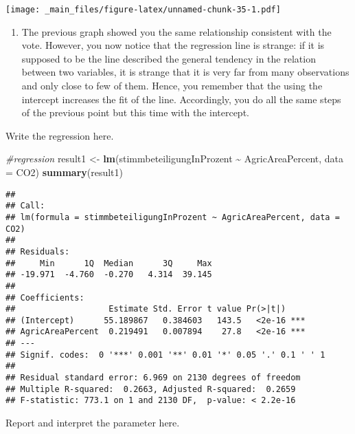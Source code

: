 \documentclass[
]{book}
\newenvironment{Shaded}{\begin{snugshade}}{\end{snugshade}}
\newcommand{\AttributeTok}[1]{\textcolor[rgb]{0.13,0.29,0.53}{#1}}
\newcommand{\CommentTok}[1]{\textcolor[rgb]{0.56,0.35,0.01}{\textit{#1}}}
\newcommand{\FunctionTok}[1]{\textcolor[rgb]{0.13,0.29,0.53}{\textbf{#1}}}
\newcommand{\NormalTok}[1]{#1}
\newcommand{\OtherTok}[1]{\textcolor[rgb]{0.56,0.35,0.01}{#1}}
\newcommand{\SpecialCharTok}[1]{\textcolor[rgb]{0.81,0.36,0.00}{\textbf{#1}}}
\providecommand{\tightlist}{%
  \setlength{\itemsep}{0pt}\setlength{\parskip}{0pt}}
\begin{document}
\texttt{[image: \_main\_files/figure-latex/unnamed-chunk-35-1.pdf]}

\begin{enumerate}
\def\labelenumi{\roman{enumi}.}
\tightlist
\item
  The previous graph showed you the same relationship consistent with the vote. However, you now notice that the regression line is strange: if it is supposed to be the line described the general tendency in the relation between two variables, it is strange that it is very far from many observations and only close to few of them. Hence, you remember that the using the intercept increases the fit of the line. Accordingly, you do all the same steps of the previous point but this time with the intercept.
\end{enumerate}

Write the regression here.

\begin{Shaded}
\begin{Highlighting}[]
\CommentTok{\#regression}
\NormalTok{result1 }\OtherTok{\textless{}{-}} \FunctionTok{lm}\NormalTok{(stimmbeteiligungInProzent }\SpecialCharTok{\textasciitilde{}}\NormalTok{ AgricAreaPercent, }\AttributeTok{data =}\NormalTok{ CO2)}
\FunctionTok{summary}\NormalTok{(result1)}
\end{Highlighting}
\end{Shaded}

\begin{verbatim}
## 
## Call:
## lm(formula = stimmbeteiligungInProzent ~ AgricAreaPercent, data = CO2)
## 
## Residuals:
##     Min      1Q  Median      3Q     Max 
## -19.971  -4.760  -0.270   4.314  39.145 
## 
## Coefficients:
##                   Estimate Std. Error t value Pr(>|t|)    
## (Intercept)      55.189867   0.384603   143.5   <2e-16 ***
## AgricAreaPercent  0.219491   0.007894    27.8   <2e-16 ***
## ---
## Signif. codes:  0 '***' 0.001 '**' 0.01 '*' 0.05 '.' 0.1 ' ' 1
## 
## Residual standard error: 6.969 on 2130 degrees of freedom
## Multiple R-squared:  0.2663, Adjusted R-squared:  0.2659 
## F-statistic: 773.1 on 1 and 2130 DF,  p-value: < 2.2e-16
\end{verbatim}

Report and interpret the parameter here.
\end{document}
